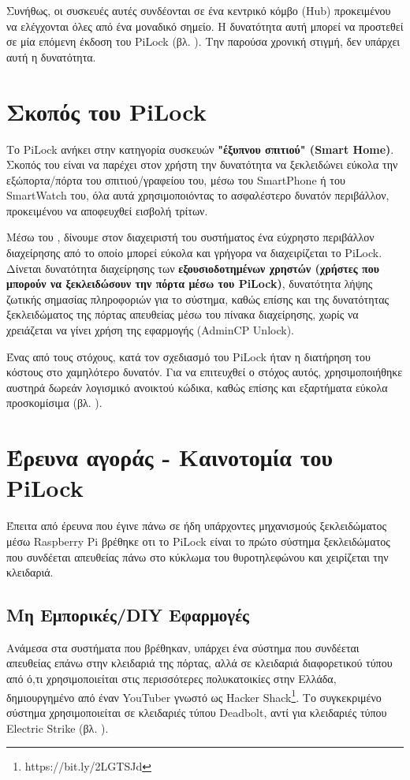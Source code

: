 	Συνήθως, οι συσκευές αυτές συνδέονται σε ένα κεντρικό κόμβο (Hub) προκειμένου να ελέγχονται όλες από ένα μοναδικό σημείο. Η δυνατότητα αυτή μπορεί να προστεθεί σε μία επόμενη έκδοση του PiLock (βλ. ). Την παρούσα χρονική στιγμή, δεν υπάρχει αυτή η δυνατότητα.

\section{Σκοπός του PiLock}
	Το PiLock ανήκει στην κατηγορία συσκευών \textbf{"έξυπνου σπιτιού" (Smart Home)}. Σκοπός του είναι να παρέχει στον χρήστη την δυνατότητα να ξεκλειδώνει εύκολα την εξώπορτα/πόρτα του σπιτιού/γραφείου του, μέσω του SmartPhone ή του SmartWatch του, όλα αυτά χρησιμοποιόντας το ασφαλέστερο δυνατόν περιβάλλον, προκειμένου να αποφευχθεί εισβολή τρίτων.

	Μέσω του \textbf{}, δίνουμε στον διαχειριστή του συστήματος ένα εύχρηστο περιβάλλον διαχείρησης από το οποίο μπορεί εύκολα και γρήγορα να διαχειρίζεται το PiLock. Δίνεται δυνατότητα διαχείρησης των \textbf{εξουσιοδοτημένων χρηστών (χρήστες που μπορούν να ξεκλειδώσουν την πόρτα μέσω του PiLock)}, δυνατότητα λήψης ζωτικής σημασίας πληροφοριών για το σύστημα, καθώς επίσης και της δυνατότητας ξεκλειδώματος της πόρτας απευθείας μέσω του πίνακα διαχείρησης, χωρίς να χρειάζεται να γίνει χρήση της εφαρμογής (AdminCP Unlock).

	Ένας από τους στόχους, κατά τον σχεδιασμό του PiLock ήταν η διατήρηση του κόστους στο χαμηλότερο δυνατόν. Για να επιτευχθεί ο στόχος αυτός, χρησιμοποιήθηκε αυστηρά δωρεάν λογισμικό ανοικτού κώδικα, καθώς επίσης και εξαρτήματα εύκολα προσκομίσιμα (βλ. ).

\section{Έρευνα αγοράς - Καινοτομία του PiLock}
	Έπειτα από έρευνα που έγινε πάνω σε ήδη υπάρχοντες μηχανισμούς ξεκλειδώματος μέσω Raspberry Pi βρέθηκε οτι το PiLock είναι το πρώτο σύστημα ξεκλειδώματος που συνδέεται απευθείας πάνω στο κύκλωμα του θυροτηλεφώνου και χειρίζεται την κλειδαριά. 

	\subsection{Μη Εμπορικές/DIY Εφαρμογές}
		Ανάμεσα στα συστήματα που βρέθηκαν, υπάρχει ένα σύστημα που συνδέεται απευθείας επάνω στην κλειδαριά της πόρτας, αλλά σε κλειδαριά διαφορετικού τύπου από ό,τι χρησιμοποιείται στις περισσότερες πολυκατοικίες στην Ελλάδα, δημιουργημένο από έναν YouTuber γνωστό ως Hacker Shack\footnote{https://bit.ly/2LGTSJd}. Το συγκεκριμένο σύστημα χρησιμοποιείται σε κλειδαριές τύπου Deadbolt, αντί για κλειδαριές τύπου Electric Strike (βλ. ).

